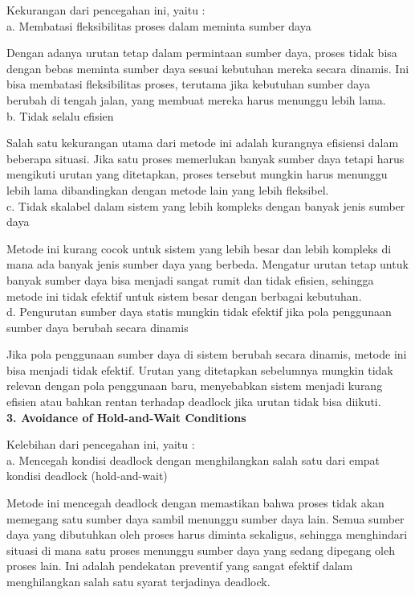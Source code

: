 \documentclass[12pt]{article}
\begin{document}
    Kekurangan dari pencegahan ini, yaitu :\\

    a. Membatasi fleksibilitas proses dalam meminta sumber daya
    
    Dengan adanya urutan tetap dalam permintaan sumber daya, proses tidak bisa dengan bebas meminta sumber daya sesuai kebutuhan mereka secara dinamis. Ini bisa membatasi fleksibilitas proses, terutama jika kebutuhan sumber daya berubah di tengah jalan, yang membuat mereka harus menunggu lebih lama.\\

    b. Tidak selalu efisien
    
    Salah satu kekurangan utama dari metode ini adalah kurangnya efisiensi dalam beberapa situasi. Jika satu proses memerlukan banyak sumber daya tetapi harus mengikuti urutan yang ditetapkan, proses tersebut mungkin harus menunggu lebih lama dibandingkan dengan metode lain yang lebih fleksibel.\\

    c. Tidak skalabel dalam sistem yang lebih kompleks dengan banyak jenis sumber daya
    
    Metode ini kurang cocok untuk sistem yang lebih besar dan lebih kompleks di mana ada banyak jenis sumber daya yang berbeda. Mengatur urutan tetap untuk banyak sumber daya bisa menjadi sangat rumit dan tidak efisien, sehingga metode ini tidak efektif untuk sistem besar dengan berbagai kebutuhan.\\

    d. Pengurutan sumber daya statis mungkin tidak efektif jika pola penggunaan sumber daya berubah secara dinamis
    
    Jika pola penggunaan sumber daya di sistem berubah secara dinamis, metode ini bisa menjadi tidak efektif. Urutan yang ditetapkan sebelumnya mungkin tidak relevan dengan pola penggunaan baru, menyebabkan sistem menjadi kurang efisien atau bahkan rentan terhadap deadlock jika urutan tidak bisa diikuti.\\

\textbf{3. Avoidance of Hold-and-Wait Conditions\\}

    Kelebihan dari pencegahan ini, yaitu :\\

    a. Mencegah kondisi deadlock dengan menghilangkan salah satu dari empat kondisi deadlock (hold-and-wait)
    
    Metode ini mencegah deadlock dengan memastikan bahwa proses tidak akan memegang satu sumber daya sambil menunggu sumber daya lain. Semua sumber daya yang dibutuhkan oleh proses harus diminta sekaligus, sehingga menghindari situasi di mana satu proses menunggu sumber daya yang sedang dipegang oleh proses lain. Ini adalah pendekatan preventif yang sangat efektif dalam menghilangkan salah satu syarat terjadinya deadlock.\\
\end{document}
